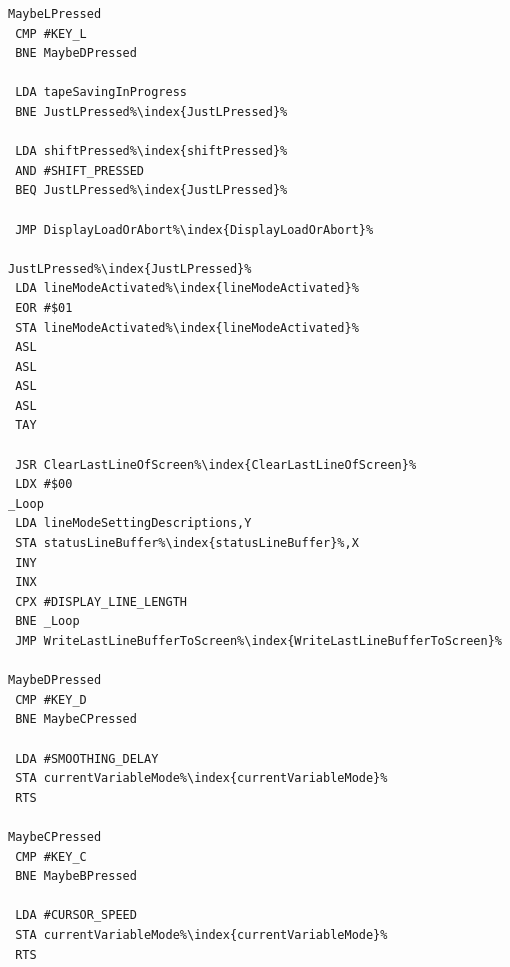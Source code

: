 \begin{minipage}[b]{0.33\linewidth}
\begin{lrbox}{\mybox}
\begin{lstlisting}[basicstyle=\ttfamily\tiny,escapechar=\%]
MaybeLPressed
 CMP #KEY_L
 BNE MaybeDPressed

 LDA tapeSavingInProgress
 BNE JustLPressed%\index{JustLPressed}%

 LDA shiftPressed%\index{shiftPressed}%
 AND #SHIFT_PRESSED
 BEQ JustLPressed%\index{JustLPressed}%

 JMP DisplayLoadOrAbort%\index{DisplayLoadOrAbort}%

JustLPressed%\index{JustLPressed}%
 LDA lineModeActivated%\index{lineModeActivated}%
 EOR #$01
 STA lineModeActivated%\index{lineModeActivated}%
 ASL
 ASL
 ASL
 ASL
 TAY

 JSR ClearLastLineOfScreen%\index{ClearLastLineOfScreen}%
 LDX #$00
_Loop
 LDA lineModeSettingDescriptions,Y
 STA statusLineBuffer%\index{statusLineBuffer}%,X
 INY
 INX
 CPX #DISPLAY_LINE_LENGTH
 BNE _Loop
 JMP WriteLastLineBufferToScreen%\index{WriteLastLineBufferToScreen}%

MaybeDPressed
 CMP #KEY_D
 BNE MaybeCPressed

 LDA #SMOOTHING_DELAY
 STA currentVariableMode%\index{currentVariableMode}%
 RTS

MaybeCPressed
 CMP #KEY_C
 BNE MaybeBPressed

 LDA #CURSOR_SPEED
 STA currentVariableMode%\index{currentVariableMode}%
 RTS

\end{lstlisting}
\end{lrbox}%
\scalebox{0.8}{\usebox{\mybox}}
\end{minipage}
\hspace{-0.1cm}
